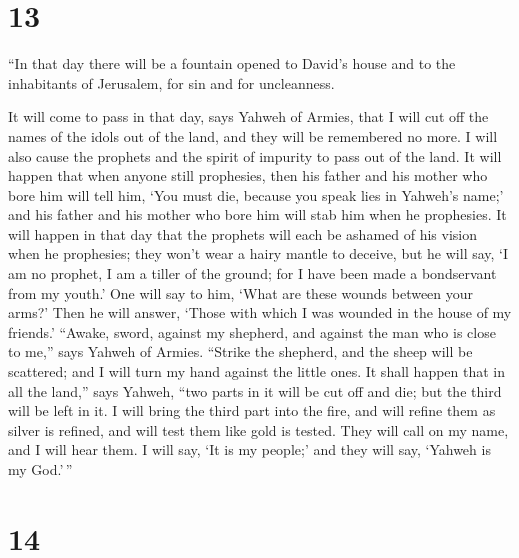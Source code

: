 \hypertarget{section-12}{%
\section{13}\label{section-12}}

 ``In that day there will be a fountain opened to David's
house and to the inhabitants of Jerusalem, for sin and for uncleanness.

 It will come to pass in that day, says Yahweh of Armies,
that I will cut off the names of the idols out of the land, and they
will be remembered no more. I will also cause the prophets and the
spirit of impurity to pass out of the land.  It will
happen that when anyone still prophesies, then his father and his mother
who bore him will tell him, `You must die, because you speak lies in
Yahweh's name;' and his father and his mother who bore him will stab him
when he prophesies.  It will happen in that day that the
prophets will each be ashamed of his vision when he prophesies; they
won't wear a hairy mantle to deceive,  but he will say, `I
am no prophet, I am a tiller of the ground; for I have been made a
bondservant from my youth.'  One will say to him, `What
are these wounds between your arms?' Then he will answer, `Those with
which I was wounded in the house of my friends.'  ``Awake,
sword, against my shepherd, and against the man who is close to me,''
says Yahweh of Armies. ``Strike the shepherd, and the sheep will be
scattered; and I will turn my hand against the little ones.
 It shall happen that in all the land,'' says Yahweh,
``two parts in it will be cut off and die; but the third will be left in
it.  I will bring the third part into the fire, and will
refine them as silver is refined, and will test them like gold is
tested. They will call on my name, and I will hear them. I will say, `It
is my people;' and they will say, `Yahweh is my God.'\,''

\hypertarget{section-13}{%
\section{14}\label{section-13}}

